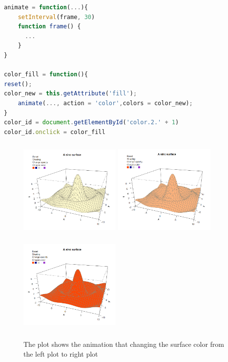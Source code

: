 \documentclass[11pt]{report}
\begin{document}
\begin{lstlisting}[language = JavaScript]
animate = function(...){
    setInterval(frame, 30)
    function frame() {
      ...
    }
}

color_fill = function(){
reset();
color_new = this.getAttribute('fill');
    animate(..., action = 'color',colors = color_new);
}
color_id = document.getElementById('color.2.' + 1)
color_id.onclick = color_fill
\end{lstlisting}


\begin{figure}[h]
	\begin{center}
		\includegraphics[height = 5cm, width = 5cm]{figure/svg/origin_1.PNG}
		\includegraphics[height = 5cm, width = 5cm]{figure/svg/change_2.PNG}
		\includegraphics[height = 5cm, width = 5cm]{figure/svg/change_3.PNG}
		\caption{The plot shows the animation that changing the surface color from the left plot to right plot}
		\label{Example_6.3.1}
	\end{center}
\end{figure}
\end{document}

